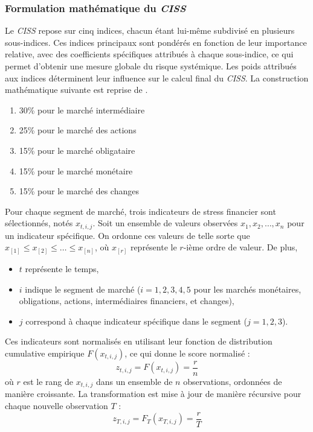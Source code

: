 
\subsubsection{Formulation mathématique du \textit{CISS}}

Le \textit{CISS} repose sur cinq indices, chacun étant lui-même subdivisé en plusieurs sous-indices. Ces indices principaux sont pondérés en fonction de leur importance relative, avec des coefficients spécifiques attribués à chaque sous-indice, ce qui permet d'obtenir une mesure globale du risque systémique. Les poids attribués aux indices déterminent leur influence sur le calcul final du \textit{CISS}. La construction mathématique suivante est reprise de \citep{hollo2012ciss}.

\begin{enumerate}
    \item  30\% pour le marché intermédiaire
    \item 25\% pour le marché des actions 
    \item 15\% pour le marché obligataire 
    \item 15\% pour le marché monétaire
    \item 15\% pour le marché des changes
\end{enumerate}

Pour chaque segment de marché, trois indicateurs de stress financier sont sélectionnés, notés \( x_{t,i,j} \). Soit un ensemble de valeurs observées \( x_1, x_2, \dots, x_n \) pour un indicateur spécifique. On ordonne ces valeurs de telle sorte que \( x_{[1]} \leq x_{[2]} \leq \dots \leq x_{[n]} \), où \( x_{[r]} \) représente le \( r \)-ième ordre de valeur. De plus,

\begin{itemize}
    \item \( t \) représente le temps,
    \item \( i \) indique le segment de marché (\( i = 1, 2, 3, 4, 5 \) pour les marchés monétaires, obligations, actions, intermédiaires financiers, et changes),
    \item \( j \) correspond à chaque indicateur spécifique dans le segment (\( j = 1, 2, 3 \)).
\end{itemize}

Ces indicateurs sont normalisés en utilisant leur fonction de distribution cumulative empirique \( F(x_{t,i,j}) \), ce qui donne le score normalisé :
\begin{equation}
z_{t,i,j} = F(x_{t,i,j}) = \frac{r}{n}
\end{equation}
où \( r \) est le rang de \( x_{t,i,j} \) dans un ensemble de \( n \) observations, ordonnées de manière croissante. La transformation est mise à jour de manière récursive pour chaque nouvelle observation \( T \) :
\begin{equation}
z_{T,i,j} = F_{T}(x_{T,i,j}) = \frac{r}{T}
\end{equation}


